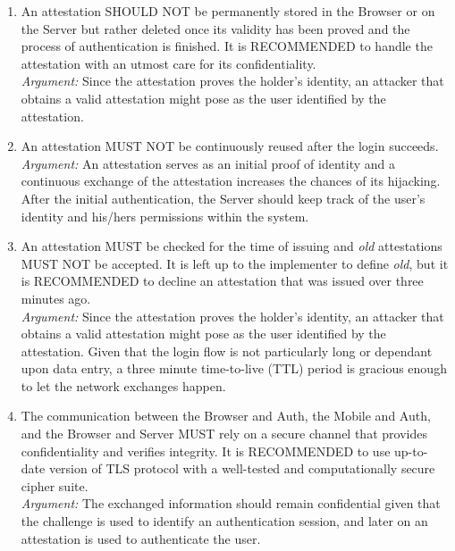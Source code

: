 \begin{enumerate}
            \item An attestation SHOULD NOT be permanently stored in the Browser or on the Server but rather deleted once
                  its validity has been proved and the process of authentication is finished. It is RECOMMENDED to handle 
                  the attestation with an utmost care for its confidentiality.\\
            \textit{Argument:} Since the attestation proves the holder's identity, an attacker that obtains a valid
                               attestation might pose as the user identified by the attestation.

            \item An attestation MUST NOT be continuously reused after the login succeeds.\\
            \textit{Argument:} An attestation serves as an initial proof of identity and a continuous exchange of the
                               attestation increases the chances of its hijacking. After the initial authentication, the
                               Server should keep track of the user's identity and his/hers permissions within the system.

            \item An attestation MUST be checked for the time of issuing and \textit{old} attestations MUST NOT be
                  accepted. It is left up to the implementer to define \textit{old}, but it is RECOMMENDED to
                  decline an attestation that was issued over three minutes ago.\\
            \textit{Argument:} Since the attestation proves the holder's identity, an attacker that obtains a valid
                               attestation might pose as the user identified by the attestation. Given that the login
                               flow is not particularly long or dependant upon data entry, a three minute time-to-live 
                               (TTL) period is gracious enough to let the network exchanges happen.

            \item The communication between the Browser and Auth, the Mobile and Auth, and the Browser and Server MUST 
                  rely on a secure channel that provides confidentiality and verifies integrity. It is RECOMMENDED to use
                  up-to-date version of TLS protocol with a well-tested and computationally secure cipher suite.\\      
            \textit{Argument:} The exchanged information should remain confidential given that the challenge is used to
                               identify an authentication session, and later on an attestation is used to authenticate the
                               user.
        \end{enumerate}

